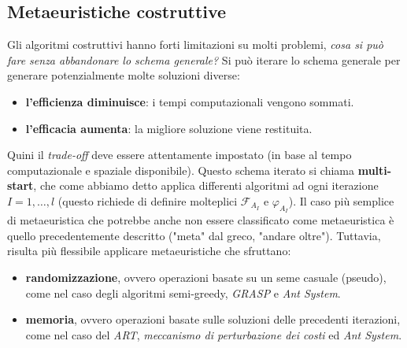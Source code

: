 \documentclass{article}
\begin{document}
\subsection{Metaeuristiche costruttive}
Gli algoritmi costruttivi hanno forti limitazioni su molti problemi, \textit{cosa si può fare senza abbandonare
lo schema generale?} Si può iterare lo schema generale per generare potenzialmente molte soluzioni
diverse:
\begin{itemize}
    \item \textbf{l'efficienza diminuisce}: i tempi computazionali vengono sommati.
    \item \textbf{l'efficacia aumenta}: la migliore soluzione viene restituita.
\end{itemize}
Quini il \textit{trade-off} deve essere attentamente impostato (in base al tempo computazionale e spaziale
disponibile). Questo schema iterato si chiama \textbf{multi-start}, che come abbiamo detto applica
differenti algoritmi ad ogni iterazione $I=1,\dots,l$ (questo richiede di definire molteplici
$\mathcal{F}_{A_I}$ e $\varphi_{A_I}$).
Il caso più semplice di metaeuristica che potrebbe anche non essere classificato come metaeuristica
è quello precedentemente descritto ("meta" dal greco, "andare oltre").
Tuttavia, risulta più flessibile applicare metaeuristiche che sfruttano:
\begin{itemize}
    \item \textbf{randomizzazione}, ovvero operazioni basate su un seme casuale (pseudo), come nel
    caso degli algoritmi semi-greedy, \textit{GRASP} e \textit{Ant System}.
    \item \textbf{memoria}, ovvero operazioni basate sulle soluzioni delle precedenti iterazioni,
    come nel caso del \textit{ART}, \textit{meccanismo di perturbazione dei costi} ed \textit{Ant System}.
\end{itemize}
\end{document}
